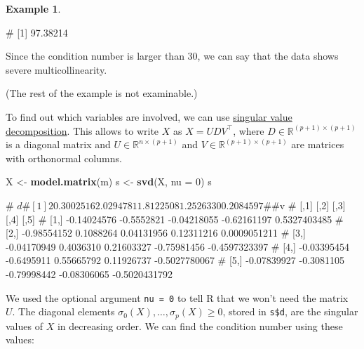 \documentclass[
  a4paper,
]{article}
\newenvironment{Shaded}{\begin{snugshade}}{\end{snugshade}}
\newcommand{\AttributeTok}[1]{\textcolor[rgb]{0.13,0.29,0.53}{#1}}
\newcommand{\DecValTok}[1]{\textcolor[rgb]{0.00,0.00,0.81}{#1}}
\newcommand{\FunctionTok}[1]{\textcolor[rgb]{0.13,0.29,0.53}{\textbf{#1}}}
\newcommand{\NormalTok}[1]{#1}
\newcommand{\OtherTok}[1]{\textcolor[rgb]{0.56,0.35,0.01}{#1}}
\theoremstyle{definition}
\theoremstyle{definition}
\newtheorem{example}{Example}[section]
\theoremstyle{definition}
\theoremstyle{definition}
\theoremstyle{remark}
\begin{document}
\begin{example}
\begin{Shaded}
\begin{Highlighting}[]
\NormalTok{\# [1] 97.38214}
\end{Highlighting}
\end{Shaded}

Since the condition number is larger than 30, we can say that the
data shows severe multicollinearity.

(The rest of the example is not examinable.)

To find out which variables are involved, we can use
\href{https://en.wikipedia.org/wiki/Singular_value_decomposition}{singular value decomposition}.
This allows to write \(X\) as \(X = U D V^\top\), where \(D\in\mathbb{R}^{(p+1)\times(p+1)}\)
is a diagonal matrix and \(U\in\mathbb{R}^{n\times(p+1)}\) and
\(V\in\mathbb{R}^{(p+1)\times(p+1)}\) are matrices with orthonormal columns.

\begin{Shaded}
\begin{Highlighting}[]
\NormalTok{X }\OtherTok{\textless{}{-}} \FunctionTok{model.matrix}\NormalTok{(m)}
\NormalTok{s }\OtherTok{\textless{}{-}} \FunctionTok{svd}\NormalTok{(X, }\AttributeTok{nu =} \DecValTok{0}\NormalTok{)}
\NormalTok{s}
\end{Highlighting}
\end{Shaded}

\begin{Shaded}
\begin{Highlighting}[]
\NormalTok{\# $d}
\NormalTok{\# [1] 20.3002516  2.0294781  1.8122508  1.2526330  0.2084597}
\NormalTok{\# }
\NormalTok{\# $v}
\NormalTok{\#             [,1]       [,2]        [,3]        [,4]          [,5]}
\NormalTok{\# [1,] {-}0.14024576 {-}0.5552821 {-}0.04218055 {-}0.62161197  0.5327403485}
\NormalTok{\# [2,] {-}0.98554152  0.1088264  0.04131956  0.12311216  0.0009051211}
\NormalTok{\# [3,] {-}0.04170949  0.4036310  0.21603327 {-}0.75981456 {-}0.4597323397}
\NormalTok{\# [4,] {-}0.03395454 {-}0.6495911  0.55665792  0.11926737 {-}0.5027780067}
\NormalTok{\# [5,] {-}0.07839927 {-}0.3081105 {-}0.79998442 {-}0.08306065 {-}0.5020431792}
\end{Highlighting}
\end{Shaded}

We used the optional argument \texttt{nu\ =\ 0} to tell R that we won't need the
matrix~\(U\). The diagonal elements \(\sigma_0(X), \ldots, \sigma_{p}(X) \geq 0\),
stored in \texttt{s\$d}, are the singular values of \(X\) in decreasing order.
We can find the condition number using these values:


\end{example}
\end{document}
